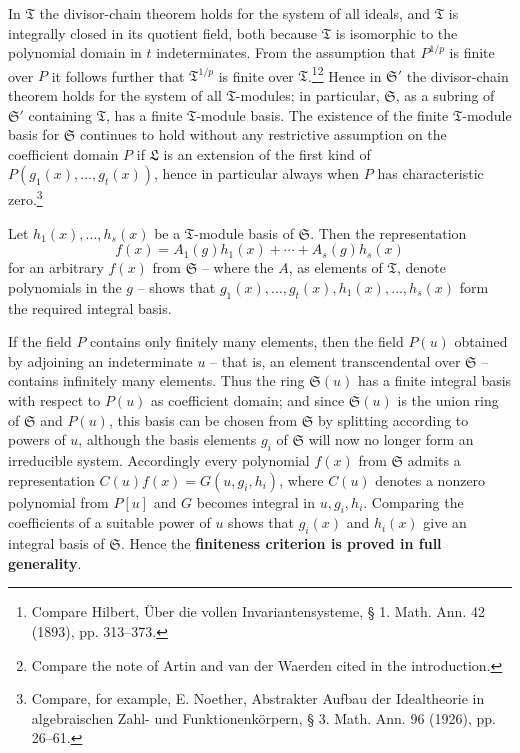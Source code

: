 \documentclass[11pt]{article}
\begin{document}
In $\mathfrak T$ the divisor-chain theorem holds for the system of all ideals, and $\mathfrak T$ is integrally closed in its quotient field, both because $\mathfrak T$ is isomorphic to the polynomial domain in $t$ indeterminates. From the assumption that $P^{1/p}$ is finite over $P$ it follows further that $\mathfrak T^{1/p}$ is finite over $\mathfrak T$.\footnote{Compare Hilbert, Über die vollen Invariantensysteme, § 1. Math. Ann. 42 (1893), pp. 313--373.}\footnote{Compare the note of Artin and van der Waerden cited in the introduction.} Hence in $\mathfrak S'$ the divisor-chain theorem holds for the system of all $\mathfrak T$-modules; in particular, $\mathfrak S$, as a subring of $\mathfrak S'$ containing $\mathfrak T$, has a finite $\mathfrak T$-module basis. The existence of the finite $\mathfrak T$-module basis for $\mathfrak S$ continues to hold without any restrictive assumption on the coefficient domain $P$ if $\mathfrak L$ is an extension of the first kind of $P(g_1(x),\ldots,g_t(x))$, hence in particular always when $P$ has characteristic zero.\footnote{Compare, for example, E. Noether, Abstrakter Aufbau der Idealtheorie in algebraischen Zahl- und Funktionenkörpern, § 3. Math. Ann. 96 (1926), pp. 26--61.}

Let $h_1(x),\ldots,h_s(x)$ be a $\mathfrak T$-module basis of $\mathfrak S$. Then the representation
\[
 f(x)=A_1(g)h_1(x)+\cdots+A_s(g)h_s(x)
\]
for an arbitrary $f(x)$ from $\mathfrak S$ -- where the $A$, as elements of $\mathfrak T$, denote polynomials in the $g$ -- shows that $g_1(x),\ldots,g_t(x),h_1(x),\ldots,h_s(x)$ form the required integral basis.

If the field $P$ contains only finitely many elements, then the field $P(u)$ obtained by adjoining an indeterminate $u$ -- that is, an element transcendental over $\mathfrak S$ -- contains infinitely many elements. Thus the ring $\mathfrak S(u)$ has a finite integral basis with respect to $P(u)$ as coefficient domain; and since $\mathfrak S(u)$ is the union ring of $\mathfrak S$ and $P(u)$, this basis can be chosen from $\mathfrak S$ by splitting according to powers of $u$, although the basis elements $g_i$ of $\mathfrak S$ will now no longer form an irreducible system. Accordingly every polynomial $f(x)$ from $\mathfrak S$ admits a representation $C(u)f(x)=G(u,g_i,h_i)$, where $C(u)$ denotes a nonzero polynomial from $P[u]$ and $G$ becomes integral in $u,g_i,h_i$. Comparing the coefficients of a suitable power of $u$ shows that $g_i(x)$ and $h_i(x)$ give an integral basis of $\mathfrak S$. Hence the \textbf{finiteness criterion is proved in full generality}.
\end{document}
